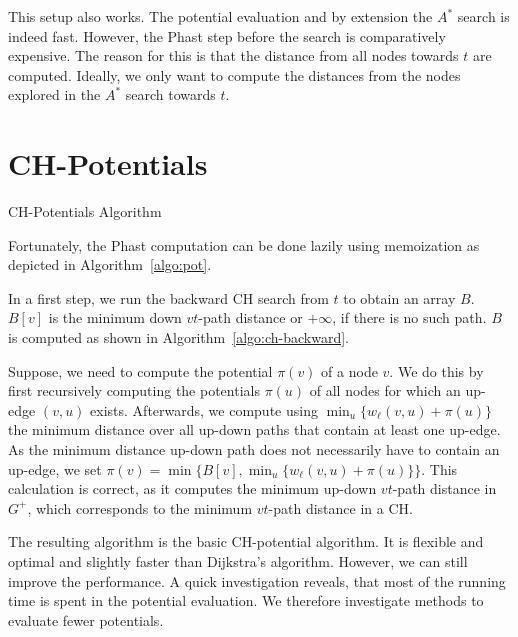\documentclass[a4paper,UKenglish,cleveref, autoref]{lipics-v2019}
\begin{document}
This setup also works.
The potential evaluation and by extension the $A^*$ search is indeed fast.
However, the Phast step before the search is comparatively expensive.
The reason for this is that the distance from all nodes towards $t$ are computed.
Ideally, we only want to compute the distances from the nodes explored in the $A^*$ search towards $t$.

\section{CH-Potentials}

\begin{algorithm2e}
\caption{CH-Potentials Algorithm}
\label{algo:pot}
\end{algorithm2e}

Fortunately, the Phast computation can be done lazily using memoization as depicted in Algorithm~\ref{algo:pot}.

In a first step, we run the backward CH search from $t$ to obtain an array $B$.
$B[v]$ is the minimum down $vt$-path distance or $+\infty$, if there is no such path.
$B$ is computed as shown in Algorithm~\ref{algo:ch-backward}.

Suppose, we need to compute the potential $\pi(v)$ of a node $v$.
We do this by first recursively computing the potentials $\pi(u)$ of all nodes for which an up-edge $(v,u)$ exists.
Afterwards, we compute using $\min_u\{w_\ell(v,u) + \pi(u)\}$ the minimum distance over all up-down paths that contain at least one up-edge.
As the minimum distance up-down path does not necessarily have to contain an up-edge, we set $\pi(v) = \min \{ B[v], \min_u\{w_\ell(v,u) + \pi(u)\} \}$.
This calculation is correct, as it computes the minimum up-down $vt$-path distance in $G^+$, which corresponds to the minimum $vt$-path distance in a CH.

The resulting algorithm is the basic CH-potential algorithm.
It is flexible and optimal and slightly faster than Dijkstra's algorithm.
However, we can still improve the performance.
A quick investigation reveals, that most of the running time is spent in the potential evaluation.
We therefore investigate methods to evaluate fewer potentials.
\end{document}
